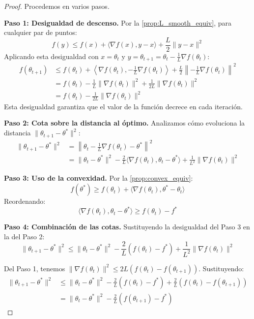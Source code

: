 \begin{proof}
	Procedemos en varios pasos.

	\textbf{Paso 1: Desigualdad de descenso.}
	Por la \autoref{prop:L_smooth_equiv}, para cualquier par de puntos:
	\[
		f(y) \leq f(x) + \langle \nabla f(x), y - x \rangle + \frac{L}{2}\|y - x\|^2
	\]
	Aplicando esta desigualdad con \(x = \theta_t\) y \(y = \theta_{t+1} = \theta_t - \frac{1}{L}\nabla f(\theta_t)\):
	\begin{align*}
		f(\theta_{t+1}) &\leq f(\theta_t) + \left\langle \nabla f(\theta_t), -\frac{1}{L}\nabla f(\theta_t) \right\rangle + \frac{L}{2}\left\|-\frac{1}{L}\nabla f(\theta_t)\right\|^2 \\
		&= f(\theta_t) - \frac{1}{L}\|\nabla f(\theta_t)\|^2 + \frac{1}{2L}\|\nabla f(\theta_t)\|^2 \\
		&= f(\theta_t) - \frac{1}{2L}\|\nabla f(\theta_t)\|^2
	\end{align*}
	Esta desigualdad garantiza que el valor de la función decrece en cada iteración.

	\textbf{Paso 2: Cota sobre la distancia al óptimo.}
	Analizamos cómo evoluciona la distancia \(\|\theta_{t+1} - \theta^*\|^2\):
	\begin{align*}
		\|\theta_{t+1} - \theta^*\|^2 &= \left\|\theta_t - \frac{1}{L}\nabla f(\theta_t) - \theta^*\right\|^2 \\
		&= \|\theta_t - \theta^*\|^2 - \frac{2}{L}\langle \nabla f(\theta_t), \theta_t - \theta^* \rangle + \frac{1}{L^2}\|\nabla f(\theta_t)\|^2
	\end{align*}

	\textbf{Paso 3: Uso de la convexidad.}
	Por la \autoref{prop:convex_equiv}:
	\[
		f(\theta^*) \geq f(\theta_t) + \langle \nabla f(\theta_t), \theta^* - \theta_t \rangle
	\]
	Reordenando:
	\[
		\langle \nabla f(\theta_t), \theta_t - \theta^* \rangle \geq f(\theta_t) - f^*
	\]

	\textbf{Paso 4: Combinación de las cotas.}
	Sustituyendo la desigualdad del Paso 3 en la del Paso 2:
	\[
		\|\theta_{t+1} - \theta^*\|^2 \leq \|\theta_t - \theta^*\|^2 - \frac{2}{L}(f(\theta_t) - f^*) + \frac{1}{L^2}\|\nabla f(\theta_t)\|^2
	\]

	Del Paso 1, tenemos \(\|\nabla f(\theta_t)\|^2 \leq 2L(f(\theta_t) - f(\theta_{t+1}))\). Sustituyendo:
	\begin{align*}
		\|\theta_{t+1} - \theta^*\|^2 &\leq \|\theta_t - \theta^*\|^2 - \frac{2}{L}(f(\theta_t) - f^*) + \frac{2}{L}(f(\theta_t) - f(\theta_{t+1})) \\
		&= \|\theta_t - \theta^*\|^2 - \frac{2}{L}(f(\theta_{t+1}) - f^*)
	\end{align*}


\end{proof}
